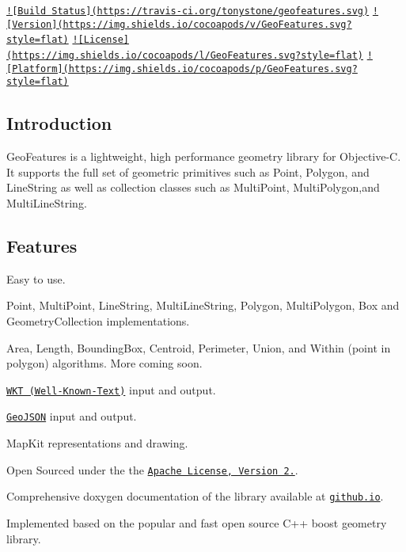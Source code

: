 \href{https://travis-ci.org/tonystone/geofeatures}{\tt !\mbox{[}Build Status\mbox{]}(https\+://travis-\/ci.\+org/tonystone/geofeatures.\+svg)} \href{http://cocoapods.org/pods/GeoFeatures}{\tt !\mbox{[}Version\mbox{]}(https\+://img.\+shields.\+io/cocoapods/v/\+Geo\+Features.\+svg?style=flat)} \href{http://cocoapods.org/pods/GeoFeatures}{\tt !\mbox{[}License\mbox{]}(https\+://img.\+shields.\+io/cocoapods/l/\+Geo\+Features.\+svg?style=flat)} \href{http://cocoapods.org/pods/GeoFeatures}{\tt !\mbox{[}Platform\mbox{]}(https\+://img.\+shields.\+io/cocoapods/p/\+Geo\+Features.\+svg?style=flat)}

\subsection*{Introduction}

Geo\+Features is a lightweight, high performance geometry library for Objective-\/\+C. It supports the full set of geometric primitives such as Point, Polygon, and Line\+String as well as collection classes such as Multi\+Point, Multi\+Polygon,and Multi\+Line\+String.

\subsection*{Features}


\begin{DoxyItemize}
\item Easy to use.
\item Point, Multi\+Point, Line\+String, Multi\+Line\+String, Polygon, Multi\+Polygon, Box and Geometry\+Collection implementations.
\item Area, Length, Bounding\+Box, Centroid, Perimeter, Union, and Within (point in polygon) algorithms. More coming soon.
\item \href{https://en.wikipedia.org/wiki/Well-known_text}{\tt W\+K\+T (Well-\/\+Known-\/\+Text)} input and output.
\item \href{http://geojson.org/}{\tt Geo\+J\+S\+O\+N} input and output.
\item Map\+Kit representations and drawing.
\item Open Sourced under the the \href{http://www.apache.org/licenses/LICENSE-2.0.html}{\tt Apache License, Version 2.}.
\item Comprehensive doxygen documentation of the library available at \href{http://tonystone.github.io/geofeatures}{\tt github.\+io}.
\item Implemented based on the popular and fast open source C++ boost geometry library.
\end{DoxyItemize}

